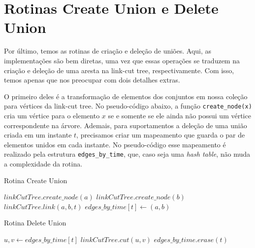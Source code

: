 \section{Rotinas Create Union e Delete Union}
\label{sec:uf-union}

Por último, temos as rotinas de criação e deleção de uniões. Aqui, as implementações são bem diretas, uma vez que essas operações se traduzem na criação e deleção de uma aresta na link-cut tree, respectivamente. Com isso, temos apenas que nos preocupar com dois detalhes extras.

O primeiro deles é a transformação de elementos dos conjuntos em nossa coleção para vértices da link-cut tree. No pseudo-código abaixo, a função \texttt{create\_node(x)} cria um vértice para o elemento $x$ se e somente se ele ainda não possui um vértice correspondente na árvore. Ademais, para suportamentos a deleção de uma união criada em um instante $t$, precisamos criar um mapeamento que guarda o par de elementos unidos em cada instante. No pseudo-código esse mapeamento é realizado pela estrutura \texttt{edges\_by\_time}, que, caso seja uma \emph{hash table}, não muda a complexidade da rotina.

\begin{algorithm}[h!]
    \caption{Rotina Create Union}\label{uf:create-union}
    \begin{algorithmic}
        \State $linkCutTree.create\_node(a)$
        \State $linkCutTree.create\_node(b)$
        \State $linkCutTree.link(a,b,t)$
        \State $edges\_by\_time[t] \gets (a, b)$
        \EndFunction
    \end{algorithmic}
\end{algorithm}

\begin{algorithm}[h!]
    \caption{Rotina Delete Union}\label{uf:delete-union}
    \begin{algorithmic}
        \State $u,v \gets edges\_by\_time[t]$
        \State $linkCutTree.cut(u,v)$
        \State $edges\_by\_time.erase(t)$
        \EndFunction
    \end{algorithmic}
\end{algorithm}

